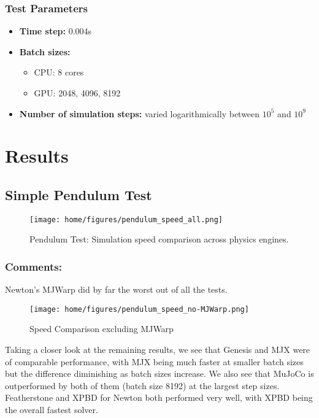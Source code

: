 \documentclass[11pt,a4paper]{article}
\begin{document}
\subsubsection{Test Parameters}
\begin{itemize}
    \item \textbf{Time step:} 0.004s
    \item \textbf{Batch sizes:} 
    \begin{itemize}
        \item CPU: 8 cores 
        \item GPU: 2048, 4096, 8192
    \end{itemize}
    \item \textbf{Number of simulation steps:} varied logarithmically between $10^5$ and $10^9$
\end{itemize}

\section{Results}
\subsection{Simple Pendulum Test}
\FloatBarrier
\begin{figure}[h!]
    \centering
    \texttt{[image: home/figures/pendulum\_speed\_all.png]}
    \caption{Pendulum Test: Simulation speed comparison across physics engines.}
    \label{fig:pendulum_speed_comparison}
\end{figure}

\FloatBarrier

\subsubsection{Comments:}
Newton's MJWarp did by far the worst out of all the tests.
\begin{figure}[H]
    \texttt{[image: home/figures/pendulum\_speed\_no-MJWarp.png]}
        \caption{Speed Comparison excluding MJWarp}
    \label{fig:pendulum_speed_comparison_no_MJWarp}
\end{figure}\noindent 
Taking a closer look at the remaining results, we see that Genesis and MJX were of comparable performance, with MJX being much faster at smaller batch sizes but the difference diminishing as batch sizes increase. We also see that MuJoCo is outperformed by both of them (batch size 8192) at the largest step sizes. \\
Featherstone and XPBD for Newton both performed very well, with XPBD being the overall fastest solver.
\end{document}
